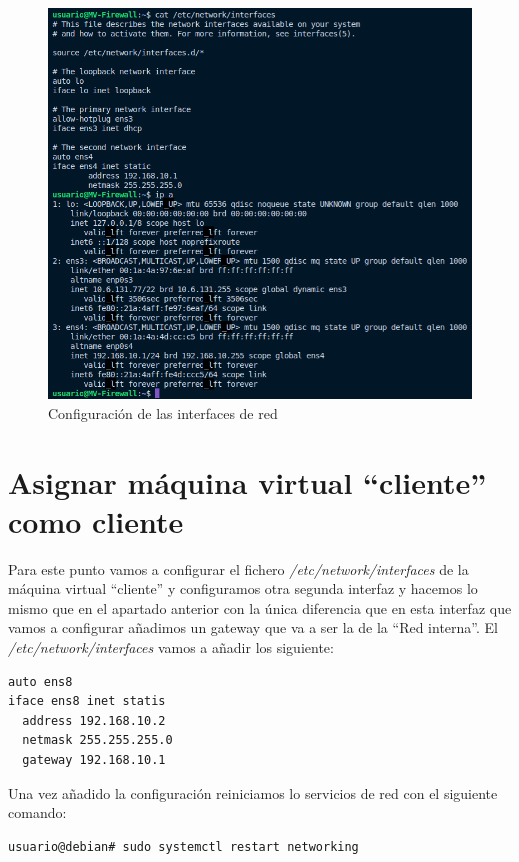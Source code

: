 \documentclass{report}
\begin{document}
\begin{figure}[H]
  \centering
  \includegraphics[scale=0.6]{img/configuracion_interfaces_firewall.png}
  \caption{Configuración de las interfaces de red}
  \label{fig:configuracion_interfaces}
\end{figure}

\cleardoublepage

\chapter{Asignar máquina virtual “cliente” como cliente}
Para este punto vamos a configurar el fichero \emph{/etc/network/interfaces} de la máquina virtual “cliente” y configuramos otra segunda interfaz y hacemos lo mismo que en el apartado anterior con la única diferencia que en esta interfaz que vamos a configurar añadimos un gateway que va a ser la de la “Red interna”.
El \emph{/etc/network/interfaces} vamos a añadir los siguiente:

\begin{verbatim}
auto ens8
iface ens8 inet statis
  address 192.168.10.2
  netmask 255.255.255.0
  gateway 192.168.10.1
  \end{verbatim}

Una vez añadido la configuración reiniciamos lo servicios de red con el siguiente comando:

\begin{verbatim}
usuario@debian# sudo systemctl restart networking
  \end{verbatim}
\end{document}
